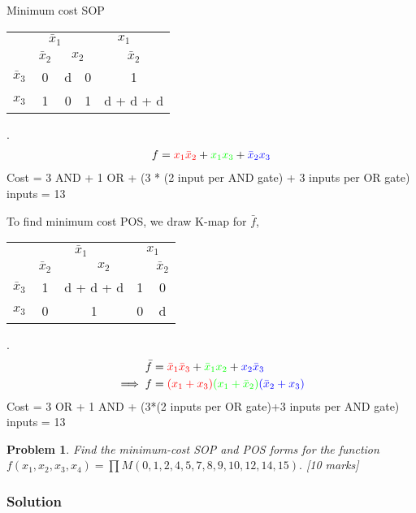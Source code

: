 \documentclass[twocolumn]{article}
\newtheorem{prob}{Problem}
\newcommand{\bx}{\bar{x}}
\newcommand{\cred}{\color{red}}
\newcommand{\cg}{\color{green}}
\newcommand{\cb}{\color{blue}}
\begin{document}
Minimum cost SOP
\\
\begin{tabular}{c|c|c|c|c}
  \toprule
  & \multicolumn{2}{c|}{$\bx_1$} & \multicolumn{2}{c}{$x_1$}
  \\
  & $\bx_2$ & \multicolumn{2}{c|}{$x_2$} & $\bx_2$
  \\ \midrule
  $\bx_3$
                                  & 0 & d & 0 & \cred 1
  \\
  $x_3$
                                  & \cb 1 & 0 & {\cg 1} & {\cg d} + \cred d + \cb d
  \\\bottomrule
\end{tabular}.
\\
\begin{align}
  f = {\cred x_1 \bx_2} + {\cg x_1 x_3} + {\cb \bx_2 x_3}
\end{align}
Cost = 3 AND  + 1 OR + (3 * (2 input per AND gate) + 3 inputs per OR gate) inputs = 13

To find minimum cost POS, we draw K-map for $\bar{f}$,
\\
\begin{tabular}{c|c|c|c|c}
  \toprule
  & \multicolumn{2}{c|}{$\bx_1$} & \multicolumn{2}{c}{$x_1$}
  \\
  & $\bx_2$ & \multicolumn{2}{c|}{$x_2$} & $\bx_2$
  \\ \midrule
  $\bx_3$
  & \cred 1 & \cred d  + \cg d + \cb d & \cb 1 & 0
  \\
  $x_3$
  & 0 & \cg 1 & 0 & d
  \\\bottomrule
\end{tabular}.
\\
\begin{align}
  \bar{f} &= {\cred \bx_1 \bx_3 } + {\cg \bx_1 x_2 } + {\cb x_2 \bx_3}
  \\
  \implies f &= {\cred (x_1 + x_3)}{\cg (x_1 + \bx_2) } {\cb (\bx_2 + x_3)}
\end{align}
Cost = 3 OR + 1 AND + (3*(2 inputs per OR gate)+3 inputs per AND gate) inputs = 13

\begin{prob}
Find the minimum-cost SOP and POS forms for the function $f(x_1 , x_2 , x_3,
x_4) = \prod M(0, 1, 2, 4, 5, 7, 8, 9, 10, 12, 14, 15).$ \cite[Prob
2.39]{brown2013fundamentals} [10 marks]
\end{prob}

\subsubsection*{Solution}
\end{document}
